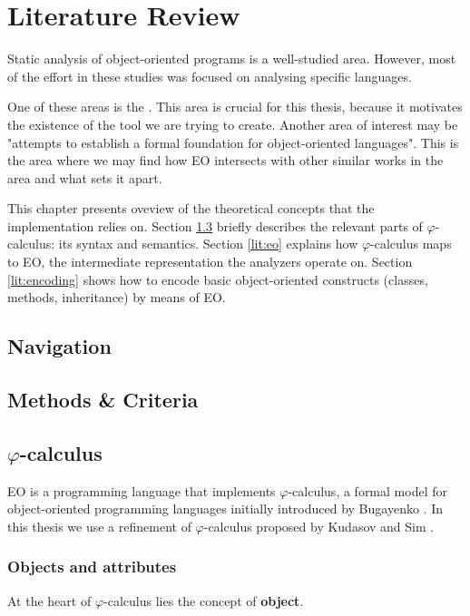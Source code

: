 \chapter{Literature Review}
\label{chap:lr}
Static analysis of object-oriented programs is a well-studied area. However, most of the effort in these studies was focused on analysing specific languages.

One of these areas is the . This area is crucial for this thesis, because it motivates the existence of the tool we are trying to create. Another area of interest may be "attempts to establish a formal foundation for object-oriented languages". This is the area where we may find how EO intersects with other similar works in the area and what sets it apart.

This chapter presents oveview of the theoretical concepts that the implementation relies on. Section \ref{lit:phicalc} briefly describes the relevant parts of $\varphi$-calculus: its syntax and semantics. Section \ref{lit:eo} explains how $\varphi$-calculus maps to EO, the intermediate representation the analyzers operate on. Section \ref{lit:encoding} shows how to encode basic object-oriented constructs (classes, methods, inheritance) by means of EO. 

\section{Navigation}

\section{Methods \& Criteria}

\section{$\varphi$-calculus}
\label{lit:phicalc}

EO is a programming language that implements $\varphi$-calculus, a formal model for object-oriented programming languages initially introduced by Bugayenko \cite{eolang}. In this thesis we use a refinement of $\varphi$-calculus proposed by Kudasov and Sim \cite{kudasov}.

\subsection{Objects and attributes}
At the heart of $\varphi$-calculus lies the concept of \textbf{object}.

